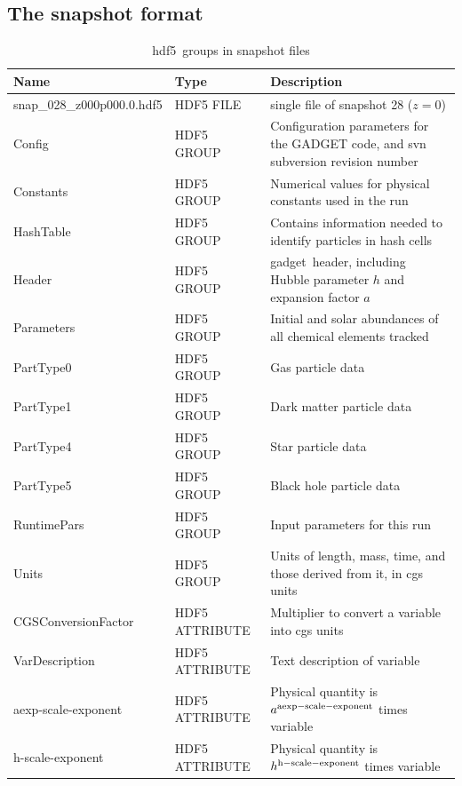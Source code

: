 \documentclass[10pt, a4paper]{article}
\newcommand{\hdf}{{\sc hdf5}}
\newcommand{\gadget}{{\sc gadget}}
\begin{document}
\subsection{The snapshot format}
\begin{table}
\label{table:file_layout}
\caption{\hdf\ groups in snapshot files}
\begin{center}
\footnotesize
\renewcommand{\arraystretch}{1.5}
\begin{tabular}{>{\ttfamily}p{4cm}p{3cm}p{9.5cm}}
\hline
Name & Type & Description \\ \hline\hline
snap\_028\_z000p000.0.hdf5 & HDF5 FILE & single file of snapshot 28 ($z=0$) \\
\hline
Config & HDF5 GROUP & Configuration parameters for the GADGET code, and svn subversion revision number \\
Constants & HDF5 GROUP & Numerical values for physical constants used in the run \\
HashTable & HDF5 GROUP & Contains information needed to identify particles in hash cells \\
Header & HDF5 GROUP & \gadget\ header, including Hubble parameter $h$ and expansion factor $a$ \\
Parameters & HDF5 GROUP & Initial and solar abundances of all chemical elements tracked \\
PartType0 & HDF5 GROUP & Gas particle data \\
PartType1 & HDF5 GROUP & Dark matter particle data  \\
PartType4 & HDF5 GROUP & Star particle data \\
PartType5 & HDF5 GROUP & Black hole particle data \\
RuntimePars & HDF5 GROUP & Input parameters for this run \\
Units & HDF5 GROUP & Units of length, mass, time, and those derived from it, in cgs units \\
\hline
CGSConversionFactor & HDF5 ATTRIBUTE & Multiplier to convert a variable into cgs units \\
VarDescription & HDF5 ATTRIBUTE & Text description of variable \\
aexp-scale-exponent & HDF5 ATTRIBUTE & Physical quantity is $a^{\rm aexp-scale-exponent}$ times variable \\
h-scale-exponent & HDF5 ATTRIBUTE & Physical quantity is $h^{\rm h-scale-exponent}$ times variable \\
\hline

\end{tabular}
\end{center}
\label{table:groups}
\end{table}
\end{document}
